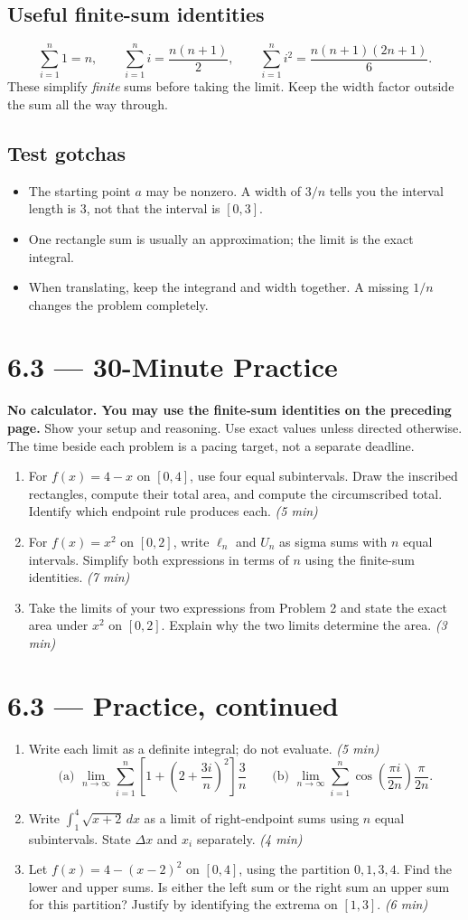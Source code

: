 \documentclass[11pt]{article}
\newcommand{\practice}[2]{\clearpage\section*{#1 --- 30-Minute Practice}\textbf{#2} Show your setup and reasoning. Use exact values unless directed otherwise. The time beside each problem is a pacing target, not a separate deadline.}
\newcommand{\continued}[1]{\clearpage\section*{#1 --- Practice, continued}}
\newcommand{\mins}[1]{\hfill\textit{(#1 min)}}
\newcommand{\dx}{\,dx}
\begin{document}
\subsection*{Useful finite-sum identities}
\[
\sum_{i=1}^n1=n,\qquad
\sum_{i=1}^n i=\frac{n(n+1)}2,\qquad
\sum_{i=1}^n i^2=\frac{n(n+1)(2n+1)}6.
\]
These simplify \emph{finite} sums before taking the limit. Keep the width factor outside the sum all the way through.

\subsection*{Test gotchas}
\begin{itemize}
\item The starting point $a$ may be nonzero. A width of $3/n$ tells you the interval length is $3$, not that the interval is $[0,3]$.
\item One rectangle sum is usually an approximation; the limit is the exact integral.
\item When translating, keep the integrand and width together. A missing $1/n$ changes the problem completely.
\end{itemize}

\practice{6.3}{No calculator. You may use the finite-sum identities on the preceding page.}
\begin{enumerate}
\item For $f(x)=4-x$ on $[0,4]$, use four equal subintervals. Draw the inscribed rectangles, compute their total area, and compute the circumscribed total. Identify which endpoint rule produces each. \mins{5}
\vfill
\item For $f(x)=x^2$ on $[0,2]$, write $\ell_n$ and $U_n$ as sigma sums with $n$ equal intervals. Simplify both expressions in terms of $n$ using the finite-sum identities. \mins{7}
\vfill
\item Take the limits of your two expressions from Problem 2 and state the exact area under $x^2$ on $[0,2]$. Explain why the two limits determine the area. \mins{3}
\vfill
\end{enumerate}
\continued{6.3}
\begin{enumerate}[start=4]
\item Write each limit as a definite integral; do not evaluate. \mins{5}
\[
\text{(a) }\lim_{n\to\infty}\sum_{i=1}^n\left[1+\left(2+\frac{3i}{n}\right)^2\right]\frac3n
\qquad
\text{(b) }\lim_{n\to\infty}\sum_{i=1}^n\cos\left(\frac{\pi i}{2n}\right)\frac{\pi}{2n}.
\]
\vfill
\item Write $\int_1^4\sqrt{x+2}\dx$ as a limit of right-endpoint sums using $n$ equal subintervals. State $\Delta x$ and $x_i$ separately. \mins{4}
\vfill
\item Let $f(x)=4-(x-2)^2$ on $[0,4]$, using the partition $0,1,3,4$.
Find the lower and upper sums. Is either the left sum or the right sum an upper sum for this partition? Justify by identifying the extrema on $[1,3]$. \mins{6}
\vfill
\end{enumerate}
\end{document}
